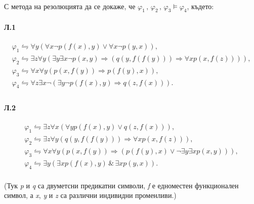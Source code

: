 \documentclass[12pt]{article}
\begin{document}
\paragraph{}
С метода на резолюцията да се докаже, че $\varphi_1\,,\,\varphi_2\,,\,\varphi_3\models\varphi_4$, където:
\paragraph{\hspace{0.5em} Л.1} 
\begin{addmargin}[1em]{2em}
\begin{gather*}
\varphi_1 \leftrightharpoons \forall y(\forall x\neg p(f(x), y)\lor \forall x \neg p(y,x)),\\
\varphi_2 \leftrightharpoons \exists z \forall y(\exists y \exists x\neg p(x,y) \Longrightarrow (q(y,f(f(y))) \Longrightarrow \forall x p(x,f(z)))),\\
\varphi_3 \leftrightharpoons \forall x\forall y (p(x, f(y)) \Longrightarrow p(f(y),x)),\\
\varphi_4 \leftrightharpoons \forall z\exists x \neg (\exists y \neg p(f(x),y)\Longrightarrow q(z,f(x))).\\
\end{gather*}
\end{addmargin}

\paragraph{\hspace{0.5em} Л.2} 
\begin{addmargin}[1em]{2em}
    \begin{gather*}
        \varphi_1 \leftrightharpoons \exists z \forall x (\forall y p(f(x), y) \lor q(z,f(x))),\\
        \varphi_2 \leftrightharpoons \exists z \forall y(q(y,f(f(y)))\Longrightarrow \forall x p(x,f(z))),\\
        \varphi_3 \leftrightharpoons \forall x\forall y (p(x, f(y)) \Longrightarrow (p(f(y),x) \lor \neg \exists y \exists x p(x,y))),\\
        \varphi_4 \leftrightharpoons \exists y(\exists x p(f(x),y)\,\&\,\exists x p(y,x)).\\
    \end{gather*}
\end{addmargin}
(Тук \textit{p} и \textit{q} са двуметсни предикатни символи, \textit{f} е едноместен функционален символ, а \textit{x}, \textit{y} и \textit{z} са различни индивидни променливи.)
\newpage
\end{document}
